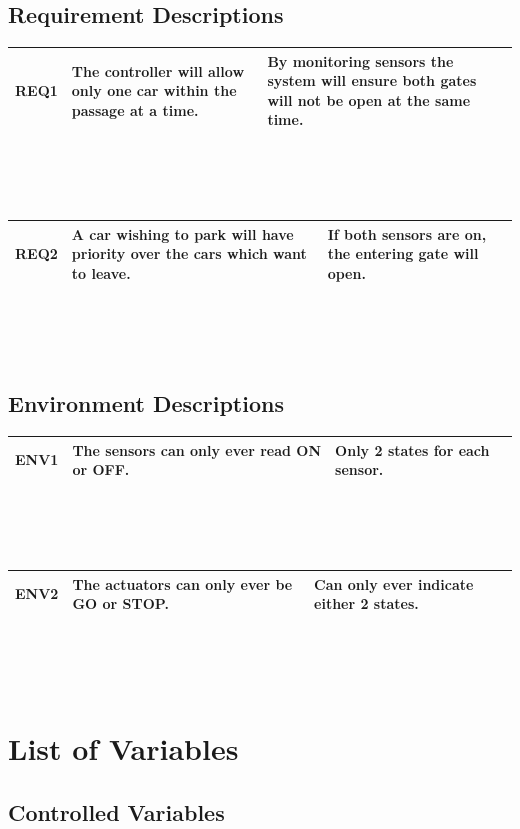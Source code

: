 \documentclass[fontsize=12pt,paper=letter,twoside]{scrartcl}
\begin{document}
\subsection{Requirement Descriptions}
\begin{tabular}{ | p{2cm} | p{6cm}  | p{6cm} |}
\hline
REQ1 & The controller will allow only one car within the passage at a time. & By monitoring sensors the system will ensure both gates will not be open at the same time. \\
\hline
\end{tabular}
\\
\\
\\
\begin{tabular}{ | p{2cm} | p{6cm}  | p{6cm} |}
\hline
REQ2 & A car wishing to park will have priority over the cars which want to leave.   & If both sensors are on, the entering gate will open. \\
\hline
\end{tabular}
\\
\\
\\
\subsection{Environment Descriptions}
\begin{tabular}{ | p{2cm} | p{6cm}  | p{6cm} |}
\hline
ENV1 & The sensors can only ever read ON or OFF.  & Only 2 states for each sensor. \\
\hline
\end{tabular}
\\
\\
\\
\begin{tabular}{ | p{2cm} | p{6cm}  | p{6cm} |}
\hline
ENV2 & The actuators can only ever be GO or STOP.  & Can only ever indicate either 2 states. \\
\hline
\end{tabular}
\\
\\
\\
\newpage
\section{List of Variables}

\subsection{Controlled Variables}
\end{document}
